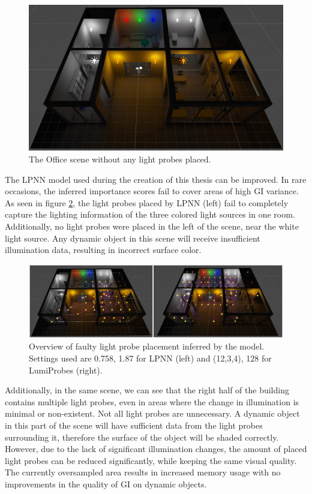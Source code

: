 \begin{figure}[h]
	\centering
	\includegraphics[width=\linewidth]{Graphics/results/office.jpg}
	\caption{The Office scene \parencite{Office2021} without any light probes placed.}
	\label{fig:office}
\end{figure}

The LPNN model used during the creation of this thesis can be improved. In rare occasions, the inferred importance scores fail to cover areas of high GI variance. As seen in figure \ref{fig:office_faulty}, the light probes placed by LPNN (left) fail to completely capture the lighting information of the three colored light sources in one room. Additionally, no light probes were placed in the left of the scene, near the white light source. Any dynamic object in this scene will receive insufficient illumination data, resulting in incorrect surface color.\newline

\begin{figure}[h]
	\centering
	\includegraphics[width=\linewidth]{Graphics/results/concats/comparison6.png}
	\caption{Overview of faulty light probe placement inferred by the model. Settings used are 0.758, 1.87 for LPNN (left) and (12,3,4), 128 for LumiProbes (right).}
	\label{fig:office_faulty}
\end{figure}

Additionally, in the same scene, we can see that the right half of the building contains multiple light probes, even in areas where the change in illumination is minimal or non-existent. Not all light probes are unnecessary. A dynamic object in this part of the scene will have sufficient data from the light probes surrounding it, therefore the surface of the object will be shaded correctly. However, due to the lack of significant illumination changes, the amount of placed light probes can be reduced significantly, while keeping the same visual quality. The currently oversampled area results in increased memory usage with no improvements in the quality of GI on dynamic objects.\newline

